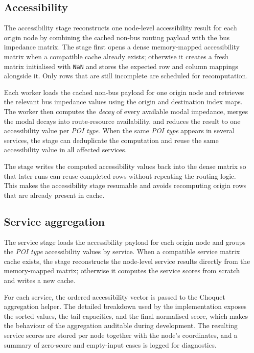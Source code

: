 \documentclass{article}
\begin{document}
\subsection{Accessibility}
The accessibility stage reconstructs one node-level accessibility result for
each origin node by combining the cached non-bus routing payload with the bus
impedance matrix. The stage first opens a dense memory-mapped accessibility
matrix when a compatible cache already exists; otherwise it creates a fresh
matrix initialised with \texttt{NaN} and stores the expected row and column
mappings alongside it. Only rows that are still incomplete are scheduled for
recomputation.

Each worker loads the cached non-bus payload for one origin node and retrieves
the relevant bus impedance values using the origin and destination index maps.
The worker then computes the \emph{decay} of every available modal impedance,
merges the modal decays into route-resource availability, and reduces the
result to one accessibility value per \emph{POI type}. When the same
\emph{POI type} appears in several services, the stage can deduplicate the
computation and reuse the same accessibility value in all affected services.

The stage writes the computed accessibility values back into the dense matrix
so that later runs can reuse completed rows without repeating the routing
logic. This makes the accessibility stage resumable and avoids recomputing
origin rows that are already present in cache.

\subsection{Service aggregation}
The service stage loads the accessibility payload for each origin node and
groups the \emph{POI type} accessibility values by service. When a compatible
service matrix cache exists, the stage reconstructs the node-level service
results directly from the memory-mapped matrix; otherwise it computes the
service scores from scratch and writes a new cache.

For each service, the ordered accessibility vector is passed to the Choquet
aggregation helper. The detailed breakdown used by the implementation exposes
the sorted values, the tail capacities, and the final normalised score, which
makes the behaviour of the aggregation auditable during development. The
resulting service scores are stored per node together with the node's
coordinates, and a summary of zero-score and empty-input cases is logged for
diagnostics.
\end{document}
